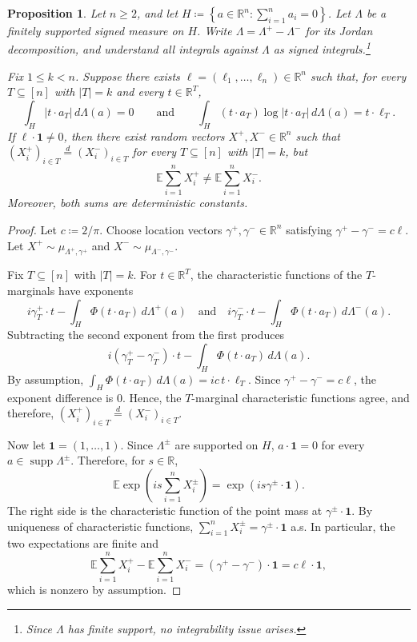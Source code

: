\documentclass[11pt]{amsart}
\theoremstyle{plain}
\newtheorem{proposition}{Proposition}
\theoremstyle{definition}
\theoremstyle{remark}
\numberwithin{equation}{section}
\newcommand{\R}{\mathbb R}
\newcommand{\E}{\mathbb E}
\newcommand{\1}{\mathbf 1}
\begin{document}
\begin{proposition}\label{prop:stable} Let \(n\ge2\), and let \(H\coloneqq\left\{a\in\R^n\colon\sum_{i=1}^na_i=0\right\}\). Let \(\Lambda\) be a finitely supported signed measure on \(H\). Write \(\Lambda=\Lambda^+-\Lambda^-\) for its Jordan decomposition, and understand all integrals against \(\Lambda\) as signed integrals.\footnote{Since \(\Lambda\) has finite support, no integrability issue arises.}

Fix \(1\le k<n\). Suppose there exists \(\ell=\left(\ell_1,\ldots,\ell_n\right)\in\R^n\) such that, for every \(T\subseteq\left[n\right]\) with \(\lvert T\rvert=k\) and every \(t\in\R^T\),
\[
\int_H\left\lvert t\cdot a_T\right\rvert\,d\Lambda\left(a\right)=0 \qquad \text{and} \qquad
\int_H\left(t\cdot a_T\right)\log\left\lvert t\cdot a_T\right\rvert\,d\Lambda\left(a\right)=t\cdot\ell_T.
\]
If \(\ell\cdot\1\ne0\), then there exist random vectors \(X^+,X^-\in\R^n\) such that \(\left(X_i^+\right)_{i\in T}\stackrel{d}=\left(X_i^-\right)_{i\in T}\) for every \(T\subseteq\left[n\right]\) with \(\lvert T\rvert=k\), but
\[
\E\sum_{i=1}^nX_i^+\ne\E\sum_{i=1}^nX_i^-.
\]
Moreover, both sums are deterministic constants.
\end{proposition}

\begin{proof}
Let \(c\coloneqq2/\pi\). Choose location vectors \(\gamma^+,\gamma^-\in\R^n\) satisfying \(\gamma^+-\gamma^-=c\ell\). Let \(X^+\sim\mu_{\Lambda^+,\gamma^+}\) and \(X^-\sim\mu_{\Lambda^-,\gamma^-}\).

Fix \(T\subseteq\left[n\right]\) with \(\lvert T\rvert=k\). For \(t\in\R^T\), the characteristic functions of the \(T\)-marginals have exponents
\[
i\gamma_T^+\cdot t-\int_H\Phi\left(t\cdot a_T\right)\,d\Lambda^+\left(a\right) \quad \text{and} \quad
i\gamma_T^-\cdot t-\int_H\Phi\left(t\cdot a_T\right)\,d\Lambda^-\left(a\right).
\]
Subtracting the second exponent from the first produces
\[
i\left(\gamma_T^+-\gamma_T^-\right)\cdot t-\int_H\Phi\left(t\cdot a_T\right)\,d\Lambda\left(a\right).
\]
By assumption, \(\int_H\Phi\left(t\cdot a_T\right)\,d\Lambda\left(a\right)=ic\,t\cdot\ell_T\). Since \(\gamma^+-\gamma^-=c\ell\), the exponent difference is \(0\). Hence, the \(T\)-marginal characteristic functions agree, and therefore, \(\left(X_i^+\right)_{i\in T}\stackrel{d}=\left(X_i^-\right)_{i\in T}\).

Now let \(\1=\left(1,\ldots,1\right)\). Since \(\Lambda^\pm\) are supported on \(H\), \(a\cdot\1=0\) for every \(a\in\operatorname{supp}\Lambda^\pm\). Therefore, for \(s\in\R\),
\[
\E\exp\left(is\sum_{i=1}^nX_i^\pm\right)=\exp\left(is\gamma^\pm\cdot\1\right).
\]
The right side is the characteristic function of the point mass at \(\gamma^\pm\cdot\mathbf 1\). By uniqueness of characteristic functions,
\(\sum_{i=1}^nX_i^\pm=\gamma^\pm\cdot\mathbf 1\)
a.s. In particular, the two expectations are finite and
\[
\E\sum_{i=1}^nX_i^+-\E\sum_{i=1}^nX_i^-=\left(\gamma^+-\gamma^-\right)\cdot\1=c\ell\cdot\1,
\]
which is nonzero by assumption.
\end{proof}
\end{document}
